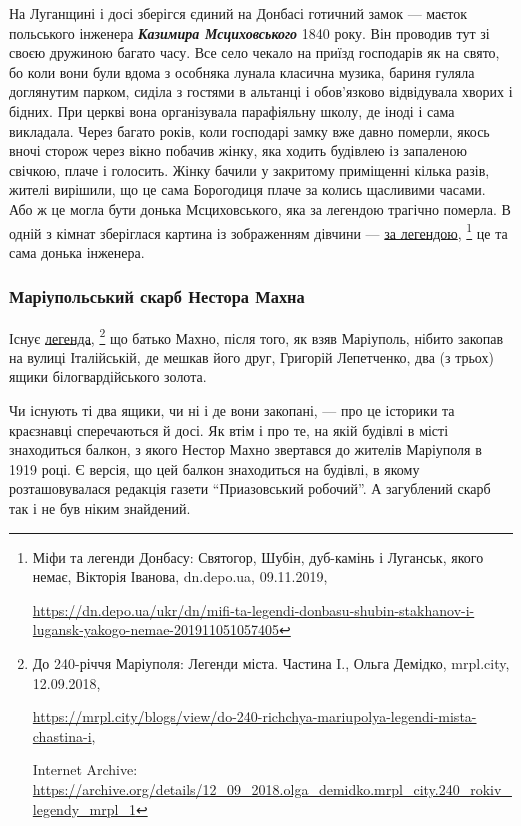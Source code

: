 На Луганщині і досі зберігся єдиний на Донбасі готичний замок — маєток
польського інженера \emph{\textbf{Казимира Мсциховського}} 1840 року. Він проводив тут зі своєю
дружиною багато часу. Все село чекало на приїзд господарів як на свято, бо коли
вони були вдома з особняка лунала класична музика, бариня гуляла доглянутим
парком, сиділа з гостями в альтанці і обов'язково відвідувала хворих і бідних.
При церкві вона організувала парафіяльну школу, де іноді і сама викладала.
Через багато років, коли господарі замку вже давно померли, якось вночі сторож
через вікно побачив жінку, яка ходить будівлею із запаленою свічкою, плаче і
голосить. Жінку бачили у закритому приміщенні кілька разів, жителі вирішили, що
це сама Борогодиця плаче за колись щасливими часами. Або ж це могла бути донька
Мсциховського, яка за легендою трагічно померла. В одній з кімнат зберіглася
картина із зображенням дівчини — \href{https://dn.depo.ua/ukr/dn/mifi-ta-legendi-donbasu-shubin-stakhanov-i-lugansk-yakogo-nemae-201911051057405}{за легендою},%
\footnote{Міфи та легенди Донбасу: Святогор, Шубін, дуб-камінь і Луганськ, якого немає, Вікторія Іванова, dn.depo.ua, 09.11.2019, \par%
\url{https://dn.depo.ua/ukr/dn/mifi-ta-legendi-donbasu-shubin-stakhanov-i-lugansk-yakogo-nemae-201911051057405}%
} це та сама донька інженера.

\subsubsection{Маріупольський скарб Нестора Махна}


Існує \href{https://archive.org/details/12_09_2018.olga_demidko.mrpl_city.240_rokiv_legendy_mrpl_1}{легенда},%
\footnote{До 240-річчя Маріуполя: Легенди міста. Частина I., Ольга Демідко, mrpl.city, 12.09.2018, \par%
\url{https://mrpl.city/blogs/view/do-240-richchya-mariupolya-legendi-mista-chastina-i}, \par%
Internet Archive: \url{https://archive.org/details/12_09_2018.olga_demidko.mrpl_city.240_rokiv_legendy_mrpl_1}%
} що батько Махно, після того, як взяв Маріуполь, нібито закопав
на вулиці Італійській, де мешкав його друг, Григорій Лепетченко, два (з трьох)
ящики білогвардійського золота.

Чи існують ті два ящики, чи ні і де вони закопані, — про це історики та
краєзнавці сперечаються й досі. Як втім і про те, на якій будівлі в місті
знаходиться балкон, з якого Нестор Махно звертався до жителів Маріуполя в 1919
році. Є версія, що цей балкон знаходиться на будівлі, в якому розташовувалася
редакція газети \enquote{Приазовський робочий}. А загублений скарб так і не був ніким
знайдений.

